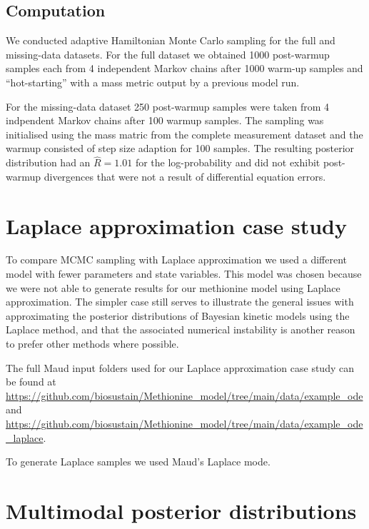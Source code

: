\documentclass[journal=asbcd6,manuscript=article,layout=traditional]{achemso}
\begin{document}
\hypertarget{computation}{%
\subsection{Computation}\label{computation}}

We conducted adaptive Hamiltonian Monte Carlo sampling for the full and
missing-data datasets. For the full dataset we obtained 1000 post-warmup
samples each from 4 independent Markov chains after 1000 warm-up samples
and ``hot-starting'' with a mass metric output by a previous model run.

For the missing-data dataset 250 post-warmup samples were taken from 4
indpendent Markov chains after 100 warmup samples. The sampling was
initialised using the mass matric from the complete measurement dataset
and the warmup consisted of step size adaption for 100 samples. The
resulting posterior distribution had an \(\hat{R} = 1.01\) for the
log-probability and did not exhibit post-warmup divergences that were
not a result of differential equation errors.

\hypertarget{laplace-approximation-case-study}{%
\section{Laplace approximation case
study}\label{laplace-approximation-case-study}}

To compare MCMC sampling with Laplace approximation we used a different
model with fewer parameters and state variables. This model was chosen
because we were not able to generate results for our methionine model
using Laplace approximation. The simpler case still serves to illustrate
the general issues with approximating the posterior distributions of
Bayesian kinetic models using the Laplace method, and that the
associated numerical instability is another reason to prefer other
methods where possible.

The full Maud input folders used for our Laplace approximation case
study can be found at
\url{https://github.com/biosustain/Methionine_model/tree/main/data/example_ode}
and
\url{https://github.com/biosustain/Methionine_model/tree/main/data/example_ode_laplace}.

To generate Laplace samples we used Maud's Laplace mode.

\hypertarget{multimodal-posterior-distributions}{%
\section{Multimodal posterior
distributions}\label{multimodal-posterior-distributions}}
\end{document}
